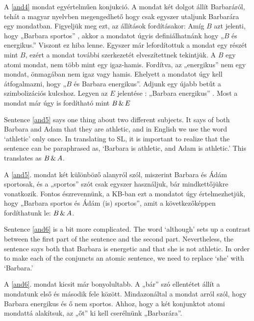 A \ref{and4} mondat egyértelműen konjukció. 
A mondat két dolgot állít Barbaráról, tehát a magyar nyelvben megengedhető hogy csak egyszer utaljunk Barbarára egy mondatban.
Figyeljük meg ezt, az állítások fordításakor: Amíg $B$ azt jelenti, hogy „Barbara sportos” ,  akkor a mondatot úgyis definiálhatnánk hogy „$B$ és energikus.” 
Viszont ez hiba lenne. 
Egyszer már lefordítottuk a mondat egy részét mint $B$, ezért a mondat további szerkezetét elveszítettnek tekintjük.
A $B$ egy atomi mondat, nem több mint egy igaz-hamis. 
Fordítva, az „energikus” nem egy mondat, önmagában nem igaz vagy hamis. 
Ehelyett a mondatot úgy kell átfogalmazni, hogy „$B$ és Barbara energikus”.
Adjunk egy újabb betűt a szimbolizációs kulcshoz. 
Legyen az $E$ jelentése : „Barbara energikus” .
Most a mondat már úgy is fordítható mint $B\,\&\, E$




Sentence \ref{and5} says one thing about two different subjects. It says of both Barbara and Adam that they are athletic, and in English we use the word `athletic' only once. In translating to SL, it is important to realize that the sentence can be paraphrased as, `Barbara is athletic, and Adam is athletic.' This translates as $B\,\&\, A$.

A \ref{and5}. mondat két különböző alanyról szól, miszerint Barbara és Ádám sportosak, és a „sportos” szót csak egyszer használjuk, bár mindkettőjükre vonatkozik. Fontos észrevennünk, a KB-ban ezt a mondatot úgy értelmezhetjük, hogy „Barbara sportos és Ádám (is) sportos”, amit a következőképpen fordíthatunk le: $B\,\&\, A$.

Sentence \ref{and6} is a bit more complicated. The word `although' sets up a contrast between the first part of the sentence and the second part. Nevertheless, the sentence says both that Barbara is energetic and that she is not athletic. In order to make each of the conjuncts an atomic sentence, we need to replace `she' with `Barbara.'

A \ref{and6}. mondat kicsit már bonyolultabb. A „bár” szó ellentétet állít a mondatunk első és második fele között. Mindazonáltal a mondat arról szól, hogy Barbara energikus és ő nem sportos. Ahhoz, hogy a két konjunktot atomi mondattá alakítsuk, az „őt” ki kell cserélnünk „Barbarára”.

